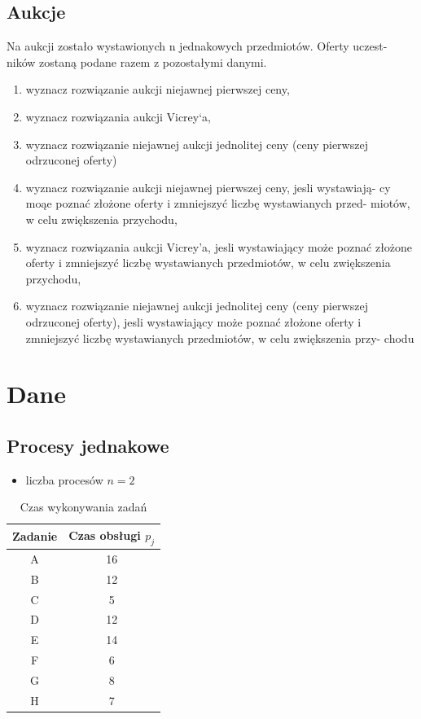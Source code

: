 \documentclass[
    12pt, %
]{../fphw}
\begin{document}
\subsection{Aukcje}
Na aukcji zostało wystawionych n jednakowych przedmiotów. Oferty uczest-
ników zostaną podane razem z pozostałymi danymi.

\begin{enumerate}
    \item wyznacz rozwiązanie aukcji niejawnej pierwszej ceny,
    \item wyznacz rozwiązania aukcji Vicrey`a,
    \item wyznacz rozwiązanie niejawnej aukcji jednolitej ceny (ceny pierwszej
          odrzuconej oferty)
    \item wyznacz rozwiązanie aukcji niejawnej pierwszej ceny, jesli wystawiają-
          cy moąe poznać złożone oferty i zmniejszyć liczbę wystawianych przed-
          miotów, w celu zwiększenia przychodu,
    \item wyznacz rozwiązania aukcji Vicrey’a, jesli wystawiający może poznać
          złożone oferty i zmniejszyć liczbę wystawianych przedmiotów, w celu
          zwiększenia przychodu,
    \item wyznacz rozwiązanie niejawnej aukcji jednolitej ceny (ceny pierwszej
          odrzuconej oferty), jesli wystawiający może poznać złożone oferty i
          zmniejszyć liczbę wystawianych przedmiotów, w celu zwiększenia przy-
          chodu
\end{enumerate}
\newpage
\section{Dane}

\subsection{Procesy jednakowe}
\begin{itemize}
    \item liczba procesów \(n = 2\)
\end{itemize}
\begin{table}[H]
    \centering
    \begin{tabular}{| c | c |}
        \hline
        Zadanie & Czas obsługi \(p_j\) \\
        \hline
        A       & 16                   \\
        B       & 12                   \\
        C       & 5                    \\
        D       & 12                   \\
        E       & 14                   \\
        F       & 6                    \\
        G       & 8                    \\
        H       & 7                    \\
        \hline
    \end{tabular}
    \caption{Czas wykonywania zadań}
\end{table}
\end{document}
